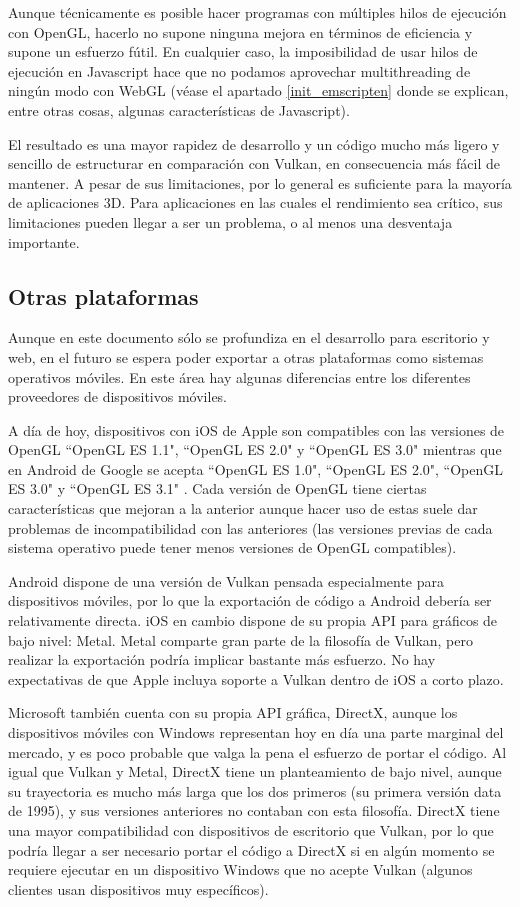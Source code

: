 Aunque técnicamente es posible hacer programas con múltiples hilos de ejecución con OpenGL, hacerlo no supone ninguna mejora en términos de eficiencia y supone un esfuerzo fútil. En cualquier caso, la imposibilidad de usar hilos de ejecución en Javascript hace que no podamos aprovechar multithreading de ningún modo con WebGL (véase el apartado \ref{init_emscripten} donde se explican, entre otras cosas, algunas características de Javascript).

El resultado es una mayor rapidez de desarrollo y un código mucho más ligero y sencillo de estructurar en comparación con Vulkan, en consecuencia más fácil de mantener. A pesar de sus limitaciones, por lo general es suficiente para la mayoría de aplicaciones 3D. Para aplicaciones en las cuales el rendimiento sea crítico, sus limitaciones pueden llegar a ser un problema, o al menos una desventaja importante.

\subsection{Otras plataformas}
Aunque en este documento sólo se profundiza en el desarrollo para escritorio y web, en el futuro se espera poder exportar a otras plataformas como sistemas operativos móviles. En este área hay algunas diferencias entre los diferentes proveedores de dispositivos móviles.

A día de hoy, dispositivos con iOS de Apple son compatibles con las versiones de OpenGL ``OpenGL ES 1.1", ``OpenGL ES 2.0" y ``OpenGL ES 3.0"  mientras que en Android de Google se acepta ``OpenGL ES 1.0", ``OpenGL ES 2.0", ``OpenGL ES 3.0" y ``OpenGL ES 3.1" . Cada versión de OpenGL tiene ciertas características que mejoran a la anterior aunque hacer uso de estas suele dar problemas de incompatibilidad con las anteriores (las versiones previas de cada sistema operativo puede tener menos versiones de OpenGL compatibles).

Android dispone de una versión de Vulkan pensada especialmente para dispositivos móviles, por lo que la exportación de código a Android debería ser relativamente directa. iOS en cambio dispone de su propia API para gráficos de bajo nivel: Metal. Metal comparte gran parte de la filosofía de Vulkan, pero realizar la exportación podría implicar bastante más esfuerzo. No hay expectativas de que Apple incluya soporte a Vulkan dentro de iOS a corto plazo.

Microsoft también cuenta con su propia API gráfica, DirectX, aunque los dispositivos móviles con Windows representan hoy en día una parte marginal del mercado, y es poco probable que valga la pena el esfuerzo de portar el código. Al igual que Vulkan y Metal, DirectX tiene un planteamiento de bajo nivel, aunque su trayectoria es mucho más larga que los dos primeros (su primera versión data de 1995), y sus versiones anteriores no contaban con esta filosofía. DirectX tiene una mayor compatibilidad con dispositivos de escritorio que Vulkan, por lo que podría llegar a ser necesario portar el código a DirectX si en algún momento se requiere ejecutar en un dispositivo Windows que no acepte Vulkan (algunos clientes usan dispositivos muy específicos).
